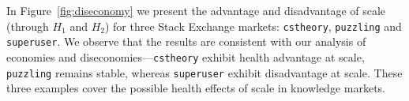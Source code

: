 In Figure~\ref{fig:diseconomy} we present the advantage and disadvantage of scale (through $H_1$ and $H_2$) for three Stack Exchange markets: \texttt{cstheory}, \texttt{puzzling} and \texttt{superuser}. We observe that the results are consistent with our analysis of economies and diseconomies---\texttt{cstheory} exhibit health advantage at scale, \texttt{puzzling} remains stable, whereas \texttt{superuser} exhibit disadvantage at scale. These three examples cover the possible health effects of scale in knowledge markets. 


